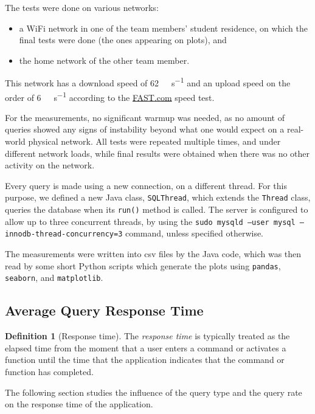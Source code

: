\documentclass[journal]{IEEEtran}
\theoremstyle{definition}
\newtheorem{defn}{Definition}[section]
\newcommand{\py}[1]{\texttt{#1}}
\newcommand{\java}[1]{\texttt{#1}}
\begin{document}
The tests were done on various networks:
\begin{itemize}
	\item a WiFi network in one of the team members' student residence, on which the final tests were done (the ones appearing on plots), and
	\item the home network of the other team member.
\end{itemize}
This network has a download speed of \SI{62}{\mega\bit\per\second} and an upload speed on the order of \SI{6}{\mega\bit\per\second} according to the \href{https://fast.com/en/gb}{\url{FAST.com}} speed test.

For the measurements, no significant warmup was needed, as no amount of queries showed any signs of instability beyond what one would expect on a real-world physical network.
All tests were repeated multiple times, and under different network loads, while final results were obtained when there was no other activity on the network.

Every query is made using a new connection, on a different thread.
For this purpose, we defined a new Java class, \java{SQLThread}, which extends the \java{Thread} class, queries the database when its \java{run()} method is called.
The server is configured to allow up to three concurrent threads, by using the \texttt{sudo mysqld --user mysql --innodb-thread-concurrency=3} command, unless specified otherwise.

The measurements were written into csv files by the Java code, which was then read by some short Python scripts which generate the plots using \py{pandas}, \py{seaborn}, and \py{matplotlib}.

\subsection{Average Query Response Time}
\begin{defn}[Response time]
	The \emph{response time} is typically treated as the elapsed time from the moment that a user enters a command or activates a function until the time that the application indicates that the command or function has completed.
\end{defn}

The following section studies the influence of the query type and the query rate on the response time of the application.
\end{document}
